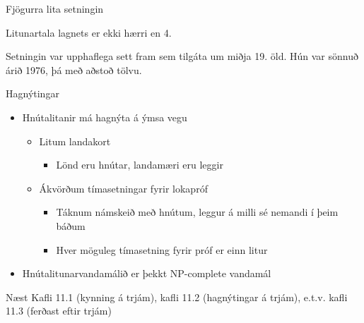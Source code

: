 \documentclass[handout]{beamer}
\begin{document}
\begin{frame}{Fjögurra lita setningin}
\begin{tcolorbox}[title=Fjögurra lita setningin]
Litunartala lagnets er ekki hærri en 4.
\end{tcolorbox}
Setningin var upphaflega sett fram sem tilgáta um miðja 19. öld. Hún var sönnuð árið 1976, þá með aðstoð tölvu.
\end{frame}

\begin{frame}{Hagnýtingar}
\begin{itemize}
 \item Hnútalitanir má hagnýta á ýmsa vegu
 \begin{itemize}
  \item Litum landakort
  \begin{itemize}
   \item Lönd eru hnútar, landamæri eru leggir
  \end{itemize}
  \item Ákvörðum tímasetningar fyrir lokapróf
  \begin{itemize}
   \item Táknum námskeið með hnútum, leggur á milli sé nemandi í þeim báðum
   \item Hver möguleg tímasetning fyrir próf er einn litur
  \end{itemize}
 \end{itemize}
 \item Hnútalitunarvandamálið er þekkt NP-complete vandamál
\end{itemize}

\end{frame}


\begin{frame}{Næst}
Kafli 11.1 (kynning á trjám), kafli 11.2 (hagnýtingar á trjám), e.t.v. kafli 11.3 (ferðast eftir trjám)
\end{frame}
\end{document}
